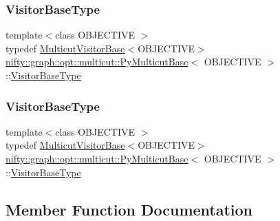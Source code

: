 \subsubsection{\texorpdfstring{Visitor\+Base\+Type}{VisitorBaseType}\hspace{0.1cm}{\footnotesize\ttfamily [1/2]}}
{\footnotesize\ttfamily template$<$class O\+B\+J\+E\+C\+T\+I\+VE $>$ \\
typedef \hyperlink{namespacenifty_1_1graph_1_1opt_1_1multicut_a3a8f68d7814a77531781fb55327f05d2}{Multicut\+Visitor\+Base}$<$O\+B\+J\+E\+C\+T\+I\+VE$>$ \hyperlink{classnifty_1_1graph_1_1opt_1_1multicut_1_1PyMulticutBase}{nifty\+::graph\+::opt\+::multicut\+::\+Py\+Multicut\+Base}$<$ O\+B\+J\+E\+C\+T\+I\+VE $>$\+::\hyperlink{classnifty_1_1graph_1_1opt_1_1multicut_1_1PyMulticutBase_ac1d714affe7c2138ec75b9faad3000f6}{Visitor\+Base\+Type}}

\mbox{\label{classnifty_1_1graph_1_1opt_1_1multicut_1_1PyMulticutBase_ac1d714affe7c2138ec75b9faad3000f6}} 
\subsubsection{\texorpdfstring{Visitor\+Base\+Type}{VisitorBaseType}\hspace{0.1cm}{\footnotesize\ttfamily [2/2]}}
{\footnotesize\ttfamily template$<$class O\+B\+J\+E\+C\+T\+I\+VE $>$ \\
typedef \hyperlink{namespacenifty_1_1graph_1_1opt_1_1multicut_a3a8f68d7814a77531781fb55327f05d2}{Multicut\+Visitor\+Base}$<$O\+B\+J\+E\+C\+T\+I\+VE$>$ \hyperlink{classnifty_1_1graph_1_1opt_1_1multicut_1_1PyMulticutBase}{nifty\+::graph\+::opt\+::multicut\+::\+Py\+Multicut\+Base}$<$ O\+B\+J\+E\+C\+T\+I\+VE $>$\+::\hyperlink{classnifty_1_1graph_1_1opt_1_1multicut_1_1PyMulticutBase_ac1d714affe7c2138ec75b9faad3000f6}{Visitor\+Base\+Type}}



\subsection{Member Function Documentation}
\mbox{\label{classnifty_1_1graph_1_1opt_1_1multicut_1_1PyMulticutBase_a0928f8539f5773900cefe88d703c14eb}} 
